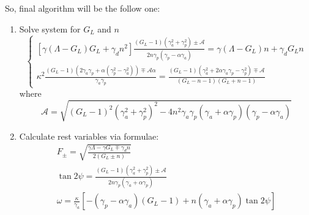 \documentclass[12pt, notitlepage]{report}
\begin{document}
So, final algorithm will be the follow one:
\begin{enumerate}
	\item Solve system for $G_L$ and $n$
		\begin{equation}
		\left\{	\begin{aligned}
				\left[ \gamma\left(\Lambda-G_L\right)G_L + \gamma_d n^2 \right]\frac{(G_L-1)(\gamma_a^2 + \gamma_p^2) \pm \mathcal{A}}{2n\gamma_p(\gamma_p - \alpha\gamma_a)}= \gamma\left(\Lambda-G_L\right)n + \gamma_d G_L n  \\
				\kappa^2 \frac{(G_L-1)(2\gamma_a\gamma_p + \alpha(\gamma_p^2-\gamma_a^2)) \mp \mathcal{A}\alpha}{\gamma_a\gamma_p} = \frac{(G_L-1)(\gamma_a^2+2\alpha\gamma_a\gamma_p-\gamma_p^2)\mp\mathcal{A}}{\left(G_L-n-1\right)\left(G_L+n-1\right)}
			\end{aligned}
		\right.
		\end{equation}
	where
	\begin{equation}
		\mathcal{A} = \sqrt{(G_L-1)^2(\gamma_a^2+\gamma_p^2)^2 - 4n^2\gamma_a\gamma_p(\gamma_a+\alpha\gamma_p)(\gamma_p - \alpha\gamma_a)}
	\end{equation}
	\item
		Calculate rest variables via formulae:
		\begin{gather}
			F_\pm = \sqrt{\frac{\gamma \Lambda - \gamma G_L \mp \gamma_d n}{2(G_L\pm n)}} \\
			\tan 2\psi = \frac{(G_L-1)(\gamma_a^2 + \gamma_p^2) \pm \mathcal{A}}{2n\gamma_p(\gamma_a+\alpha\gamma_p)}\\
			\omega = \frac{\kappa}{\gamma_a} \left[-\left(\gamma_p - \alpha \gamma_a\right)\left(G_L - 1\right) +   n \left(\gamma_a + \alpha\gamma_p\right)\tan 2\psi\right]			
		\end{gather}
\end{enumerate}
\end{document}
